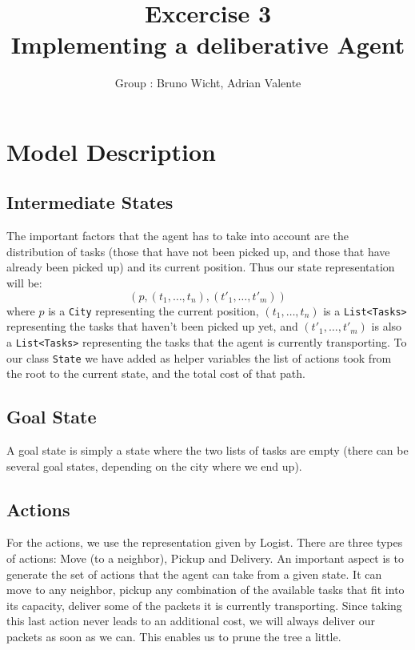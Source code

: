 \documentclass[11pt]{article}
\title{\bf Excercise 3\\ Implementing a deliberative Agent}
\author{Group \textnumero : Bruno Wicht, Adrian Valente}
\begin{document}
\maketitle

\section{Model Description}

\subsection{Intermediate States}
The important factors that the agent has to take into account are the distribution of tasks (those that have not been picked up, and those that have already been picked up) and its current position. Thus our state representation will be:
$$ (p, (t_1,\dots,t_n), (t'_1,\dots,t'_m)) $$
where $p$ is a \texttt{City} representing the current position, $(t_1,\dots,t_n)$ is a \texttt{List<Tasks>} representing the tasks that haven't been picked up yet, and $(t'_1,\dots,t'_m)$ is also a \texttt{List<Tasks>} representing the tasks that the agent is currently transporting. To our class \texttt{State} we have added as helper variables the list of actions took from the root to the current state, and the total cost of that path.

\subsection{Goal State}
A goal state is simply a state where the two lists of tasks are empty (there can be several goal states, depending on the city where we end up). 

\subsection{Actions}
For the actions, we use the representation given by Logist. There are three types of actions: Move (to a neighbor), Pickup and Delivery. An important aspect is to generate the set of actions that the agent can take from a given state. It can move to any neighbor, pickup any combination of the available tasks that fit into its capacity, deliver some of the packets it is currently transporting. Since taking this last action never leads to an additional cost, we will always deliver our packets as soon as we can. This enables us to prune the tree a little. 
\end{document}
